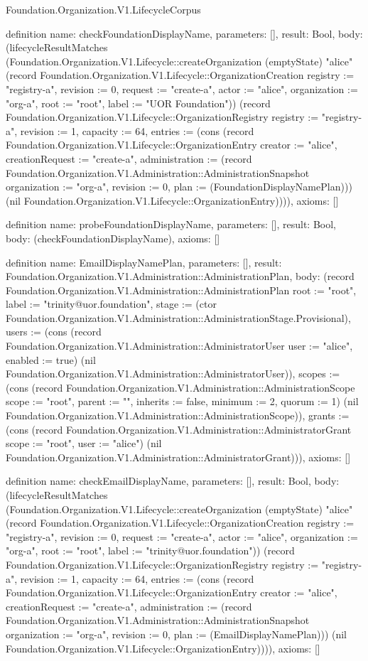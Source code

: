 \begin{lexlean}{Foundation.Organization.V1.LifecycleCorpus}
\begin{semanticmodule}
definition{
  name: checkFoundationDisplayName,
  parameters: [],
  result: Bool,
  body: (lifecycleResultMatches (Foundation.Organization.V1.Lifecycle::createOrganization (emptyState) "alice" (record Foundation.Organization.V1.Lifecycle::OrganizationCreation {registry := "registry-a", revision := 0, request := "create-a", actor := "alice", organization := "org-a", root := "root", label := "UOR Foundation"})) (record Foundation.Organization.V1.Lifecycle::OrganizationRegistry {registry := "registry-a", revision := 1, capacity := 64, entries := (cons (record Foundation.Organization.V1.Lifecycle::OrganizationEntry {creator := "alice", creationRequest := "create-a", administration := (record Foundation.Organization.V1.Administration::AdministrationSnapshot {organization := "org-a", revision := 0, plan := (FoundationDisplayNamePlan)})}) (nil Foundation.Organization.V1.Lifecycle::OrganizationEntry))})),
  axioms: []
}

definition{
  name: probeFoundationDisplayName,
  parameters: [],
  result: Bool,
  body: (checkFoundationDisplayName),
  axioms: []
}

definition{
  name: EmailDisplayNamePlan,
  parameters: [],
  result: Foundation.Organization.V1.Administration::AdministrationPlan,
  body: (record Foundation.Organization.V1.Administration::AdministrationPlan {root := "root", label := "trinity@uor.foundation", stage := (ctor Foundation.Organization.V1.Administration::AdministrationStage.Provisional), users := (cons (record Foundation.Organization.V1.Administration::AdministratorUser {user := "alice", enabled := true}) (nil Foundation.Organization.V1.Administration::AdministratorUser)), scopes := (cons (record Foundation.Organization.V1.Administration::AdministrationScope {scope := "root", parent := "", inherits := false, minimum := 2, quorum := 1}) (nil Foundation.Organization.V1.Administration::AdministrationScope)), grants := (cons (record Foundation.Organization.V1.Administration::AdministratorGrant {scope := "root", user := "alice"}) (nil Foundation.Organization.V1.Administration::AdministratorGrant))}),
  axioms: []
}

definition{
  name: checkEmailDisplayName,
  parameters: [],
  result: Bool,
  body: (lifecycleResultMatches (Foundation.Organization.V1.Lifecycle::createOrganization (emptyState) "alice" (record Foundation.Organization.V1.Lifecycle::OrganizationCreation {registry := "registry-a", revision := 0, request := "create-a", actor := "alice", organization := "org-a", root := "root", label := "trinity@uor.foundation"})) (record Foundation.Organization.V1.Lifecycle::OrganizationRegistry {registry := "registry-a", revision := 1, capacity := 64, entries := (cons (record Foundation.Organization.V1.Lifecycle::OrganizationEntry {creator := "alice", creationRequest := "create-a", administration := (record Foundation.Organization.V1.Administration::AdministrationSnapshot {organization := "org-a", revision := 0, plan := (EmailDisplayNamePlan)})}) (nil Foundation.Organization.V1.Lifecycle::OrganizationEntry))})),
  axioms: []
}


\end{semanticmodule}
\end{lexlean}
